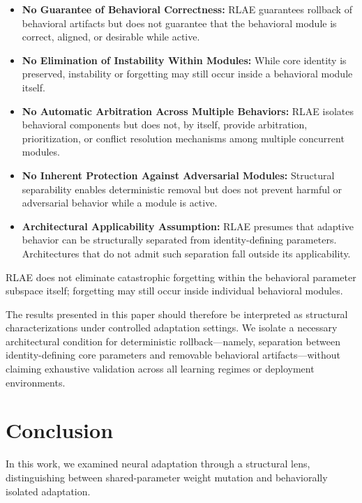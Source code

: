 \documentclass{article}
\begin{document}
	\begin{itemize}
		\item \textbf{No Guarantee of Behavioral Correctness:}
		RLAE guarantees rollback of behavioral artifacts but does not guarantee that the behavioral module is correct, aligned, or desirable while active.
		
		\item \textbf{No Elimination of Instability Within Modules:}
		While core identity is preserved, instability or forgetting may still occur inside a behavioral module itself.
		
		\item \textbf{No Automatic Arbitration Across Multiple Behaviors:}
		RLAE isolates behavioral components but does not, by itself, provide arbitration, prioritization, or conflict resolution mechanisms among multiple concurrent modules.
		
		\item \textbf{No Inherent Protection Against Adversarial Modules:}
		Structural separability enables deterministic removal but does not prevent harmful or adversarial behavior while a module is active.
		
		\item \textbf{Architectural Applicability Assumption:}
		RLAE presumes that adaptive behavior can be structurally separated from identity-defining parameters. Architectures that do not admit such separation fall outside its applicability.
	\end{itemize}
	
	RLAE does not eliminate catastrophic forgetting within the behavioral parameter subspace itself; forgetting may still occur inside individual behavioral modules.
	
	The results presented in this paper should therefore be interpreted as structural characterizations under controlled adaptation settings. We isolate a necessary architectural condition for deterministic rollback—namely, separation between identity-defining core parameters and removable behavioral artifacts—without claiming exhaustive validation across all learning regimes or deployment environments.
	
	
	\section{Conclusion}
	\label{sec:conclusion}
	
	In this work, we examined neural adaptation through a structural lens,
	distinguishing between shared-parameter weight mutation and
	behaviorally isolated adaptation.
	
\end{document}
